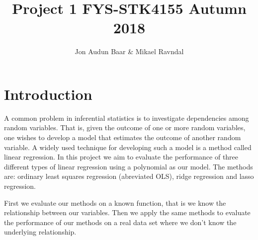 \documentclass[a4paper,norsk]{article}
\title {Project 1 FYS-STK4155 Autumn 2018}
\author {Jon Audun Baar \& Mikael Ravndal}
\begin{document}
\maketitle

\section{Introduction}
A common problem in inferential statistics is to investigate dependencies
among random variables. That is, given the outcome of one or more random 
variables, one wishes to develop a model that estimates the outcome of 
another random variable.
A widely used technique for developing such a model is a method called 
linear regression. In this project 
we aim to evaluate the performance of three different types of 
linear regression using a polynomial as our model. The methods are:
ordinary least squares regression (abreviated OLS), ridge regression and
lasso regression.
\par First we evaluate our methods on a known function, that is we know 
the relationship between our variables. Then we apply the same methods 
to evaluate the performance of our methods on a real data set where 
we don’t know the underlying relationship.
\end{document}
